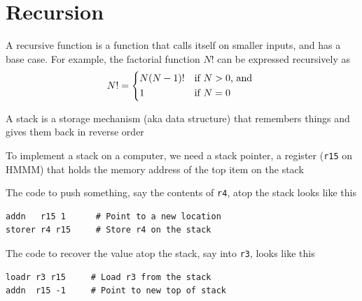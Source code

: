 \documentclass[8pt,a4paper,compress]{beamer}
\begin{document}
\section{Recursion}

\begin{frame}[fragile]
\pause

A recursive function is a function that calls itself on smaller inputs, and has a base case. For example, the factorial function $N!$ can be expressed recursively as 
\[
N! = \begin{dcases*}
N(N-1)! & if $N > 0$, and \\
1       & if $N=0$
\end{dcases*}
\]

\pause
\bigskip

A stack is a storage mechanism (aka data structure) that remembers things and gives them back in reverse order

\pause
\bigskip

To implement a stack on a computer, we need a stack pointer, a register (\lstinline{r15} on HMMM) that holds the memory address of the top item on the stack

\pause
\bigskip

The code to push something, say the contents of \lstinline{r4}, atop the stack looks like this
\begin{lstlisting}[language={}]
addn   r15 1      # Point to a new location
storer r4 r15     # Store r4 on the stack
\end{lstlisting}

\pause
\bigskip

The code to recover the value atop the stack, say into \lstinline{r3}, looks like this
\begin{lstlisting}[language={}]
loadr r3 r15     # Load r3 from the stack
addn  r15 -1     # Point to new top of stack
\end{lstlisting}
\end{frame}
\end{document}
